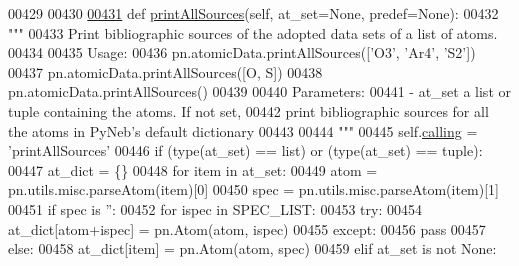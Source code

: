 \begin{DoxyCode}
00429 
00430 
\hypertarget{manage__atomic__data_8py_source_l00431}{}\hyperlink{classpyneb_1_1utils_1_1manage__atomic__data_1_1___manage_atomic_data_a17f7d0a39484aa363bd2814ffbee2855}{00431}     \textcolor{keyword}{def }\hyperlink{classpyneb_1_1utils_1_1manage__atomic__data_1_1___manage_atomic_data_a17f7d0a39484aa363bd2814ffbee2855}{printAllSources}(self, at\_set=None, predef=None):
00432         \textcolor{stringliteral}{"""}
00433 \textcolor{stringliteral}{        Print bibliographic sources of the adopted data sets of a list of atoms.}
00434 \textcolor{stringliteral}{        }
00435 \textcolor{stringliteral}{        Usage:}
00436 \textcolor{stringliteral}{        pn.atomicData.printAllSources(['O3', 'Ar4', 'S2'])}
00437 \textcolor{stringliteral}{        pn.atomicData.printAllSources([O, S])}
00438 \textcolor{stringliteral}{        pn.atomicData.printAllSources()}
00439 \textcolor{stringliteral}{}
00440 \textcolor{stringliteral}{        Parameters: }
00441 \textcolor{stringliteral}{            - at\_set   a list or tuple containing the atoms. If not set, }
00442 \textcolor{stringliteral}{                       print bibliographic sources for all the atoms in PyNeb's default dictionary}
00443 \textcolor{stringliteral}{                       }
00444 \textcolor{stringliteral}{        """}        
00445         self.\hyperlink{classpyneb_1_1utils_1_1manage__atomic__data_1_1___manage_atomic_data_ab10b91ca784741ce7af163d010802434}{calling} = \textcolor{stringliteral}{'printAllSources'}
00446         \textcolor{keywordflow}{if} (type(at\_set) == list) \textcolor{keywordflow}{or} (type(at\_set) == tuple):
00447             at\_dict = \{\}
00448             \textcolor{keywordflow}{for} item \textcolor{keywordflow}{in} at\_set:
00449                 atom = pn.utils.misc.parseAtom(item)[0]
00450                 spec = pn.utils.misc.parseAtom(item)[1]
00451                 \textcolor{keywordflow}{if} spec \textcolor{keywordflow}{is} \textcolor{stringliteral}{''}:
00452                     \textcolor{keywordflow}{for} ispec \textcolor{keywordflow}{in} SPEC\_LIST:
00453                         \textcolor{keywordflow}{try}:
00454                             at\_dict[atom+ispec] = pn.Atom(atom, ispec)
00455                         \textcolor{keywordflow}{except}:
00456                             \textcolor{keywordflow}{pass}
00457                 \textcolor{keywordflow}{else}:
00458                     at\_dict[item] = pn.Atom(atom, spec)
00459         \textcolor{keywordflow}{elif} at\_set \textcolor{keywordflow}{is} \textcolor{keywordflow}{not} \textcolor{keywordtype}{None}:

\end{DoxyCode}
